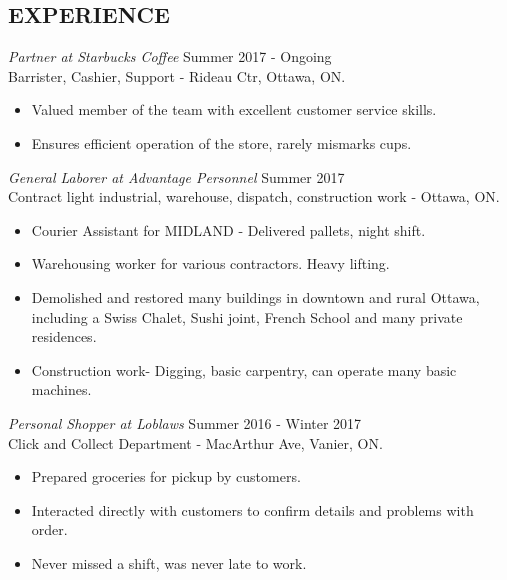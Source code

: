 \documentclass[margin]{res}
\begin{document}
\begin{resume}
\section{EXPERIENCE} {\sl Partner at Starbucks Coffee} \hfill Summer 2017 - Ongoing \\
                Barrister, Cashier, Support - Rideau Ctr, Ottawa, ON.
                 \begin{itemize}  \itemsep -2pt %
                 \item Valued member of the team with excellent customer service skills. 
                \item  Ensures efficient operation of the store, rarely mismarks cups.
                \end{itemize}
 
 {\sl General Laborer at Advantage Personnel} \hfill    Summer 2017 \\
                Contract light industrial, warehouse, dispatch, construction work - Ottawa, ON.
                 \begin{itemize}  \itemsep -2pt %
                 \item Courier Assistant for MIDLAND - Delivered pallets, night shift.
                 \item Warehousing worker for various contractors. Heavy lifting.
                 \item Demolished and restored many buildings in downtown and rural Ottawa, including a Swiss Chalet, Sushi joint, French School and many private residences.
\item Construction work- Digging, basic carpentry, can operate many basic machines.                 
                 \end{itemize} 
 
 
 
                {\sl Personal Shopper at Loblaws} \hfill            Summer 2016 - Winter 2017 \\
                Click and Collect Department - MacArthur Ave, Vanier, ON.
                 \begin{itemize}  \itemsep -2pt %
                 \item Prepared groceries for pickup by customers.
                 \item Interacted directly with customers to confirm details and problems with order.
                 \item Never missed a shift, was never late to work.
                 \end{itemize} 
                 

\end{resume}
\end{document}
